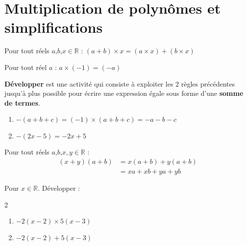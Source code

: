 %	



\section{Multiplication de polynômes et simplifications}
\begin{tBox}[frametitle={Règle 1 : Axiome de distributivité}]
	Pour tout réels $a$,$b$,$x\in\mathbb{R}$ :  
	$ 	(a+b)\times x = (a\times x)+(b\times x)  	$ 
\end{tBox}
\begin{tBox}[frametitle={Règle 2}] Pour tout réel $a$ :  
	$a \times (-1) = (-a)$
\end{tBox}
\textbf{Développer} est une activité qui consiste à exploiter les 2 règles précédentes jusqu'à plus possible pour écrire une expression égale sous forme d'une \textbf{somme de termes}.
\begin{example}\hfill  
		\begin{enumerate}[label={$\Alph*=$}, leftmargin=*] 
			\item $-(a + b + c) = (-1) × (a + b + c) =  -a-b-c$
			\item $- (2x-5) = -2x+5   $ 
		\end{enumerate} 
\end{example}  
\begin{tBox}[frametitle={La double distributivité}]
	Pour tout réels $a$,$b$,$x, y\in\mathbb{R}$ : 
	\begin{align*}
		(x + y)(a + b) &= x(a + b) + y(a + b)\\
		& = xa + xb + ya + yb
	\end{align*} 
\end{tBox} 
\begin{example} Pour $x\in \mathbb{R}$. Développer :
\begin{multicols}{2}
	\begin{enumerate}[label={$\Alph*=$},leftmargin=*]
		\item   $-2(x-2)\times 5(x-3)$
		\item   $-2(x-2)+5(x-3)$
	\end{enumerate}
\end{multicols}
\end{example}

